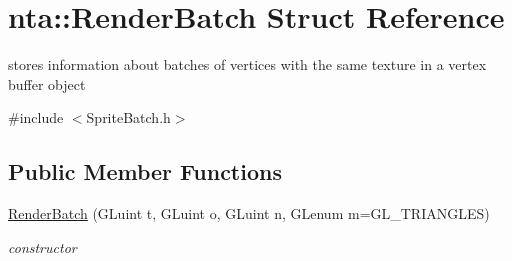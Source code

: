 \hypertarget{structnta_1_1RenderBatch}{}\section{nta\+:\+:Render\+Batch Struct Reference}
\label{structnta_1_1RenderBatch}


stores information about batches of vertices with the same texture in a vertex buffer object  




{\ttfamily \#include $<$Sprite\+Batch.\+h$>$}

\subsection*{Public Member Functions}
\begin{DoxyCompactItemize}
\item 
\mbox{\label{structnta_1_1RenderBatch_a02a531d942296d7194ca96f7ed614f14}} 
\hyperlink{structnta_1_1RenderBatch_a02a531d942296d7194ca96f7ed614f14}{Render\+Batch} (G\+Luint t, G\+Luint o, G\+Luint n, G\+Lenum m=G\+L\+\_\+\+T\+R\+I\+A\+N\+G\+L\+ES)
\begin{DoxyCompactList}\small\item\em constructor \end{DoxyCompactList}\end{DoxyCompactItemize}
